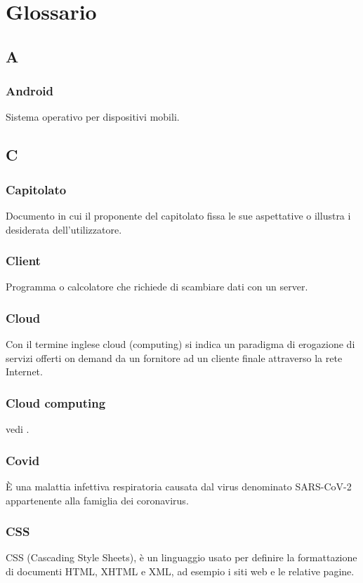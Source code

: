 \section{Glossario}


\subsection*{A}
\subsubsection*{Android} Sistema operativo per dispositivi mobili.

\subsection*{C}
\subsubsection*{Capitolato} Documento in cui il proponente del capitolato fissa le sue aspettative o illustra i desiderata dell'utilizzatore.
\subsubsection*{Client} Programma o calcolatore che richiede di scambiare dati con un server.
\subsubsection*{Cloud} Con il termine inglese cloud (computing) si indica un paradigma di erogazione di servizi offerti on demand da un fornitore ad un cliente finale attraverso la rete Internet.
\subsubsection*{Cloud computing} vedi .
\subsubsection*{Covid} È una malattia infettiva respiratoria causata dal virus denominato SARS-CoV-2 appartenente alla famiglia dei coronavirus.
\subsubsection*{CSS} CSS (Cascading Style Sheets), è un linguaggio usato per definire la formattazione di documenti HTML, XHTML e XML, ad esempio i siti web e le relative pagine.
